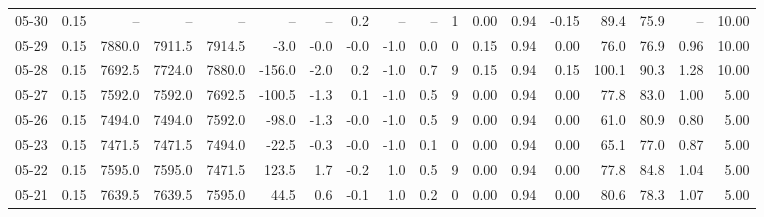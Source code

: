 \begin{threeparttable}
{\begin{tabular}{lrrrrrrrrrrrrrrrrr}
  05-30 &     0.15 &     -- &     -- &     -- &         -- &             -- &                       0.2 &                       -- &                  -- &              1 &       0.00 &      0.94 &          -0.15 &             89.4 &                75.9 &              -- &                  10.00 \\
  05-29 &     0.15 & 7880.0 & 7911.5 & 7914.5 &       -3.0 &           -0.0 &                      -0.0 &                     -1.0 &                 0.0 &              0 &       0.15 &      0.94 &           0.00 &             76.0 &                76.9 &            0.96 &                  10.00 \\
  05-28 &     0.15 & 7692.5 & 7724.0 & 7880.0 &     -156.0 &           -2.0 &                       0.2 &                     -1.0 &                 0.7 &              9 &       0.15 &      0.94 &           0.15 &            100.1 &                90.3 &            1.28 &                  10.00 \\
  05-27 &     0.15 & 7592.0 & 7592.0 & 7692.5 &     -100.5 &           -1.3 &                       0.1 &                     -1.0 &                 0.5 &              9 &       0.00 &      0.94 &           0.00 &             77.8 &                83.0 &            1.00 &                   5.00 \\
  05-26 &     0.15 & 7494.0 & 7494.0 & 7592.0 &      -98.0 &           -1.3 &                      -0.0 &                     -1.0 &                 0.5 &              9 &       0.00 &      0.94 &           0.00 &             61.0 &                80.9 &            0.80 &                   5.00 \\
  05-23 &     0.15 & 7471.5 & 7471.5 & 7494.0 &      -22.5 &           -0.3 &                      -0.0 &                     -1.0 &                 0.1 &              0 &       0.00 &      0.94 &           0.00 &             65.1 &                77.0 &            0.87 &                   5.00 \\
  05-22 &     0.15 & 7595.0 & 7595.0 & 7471.5 &      123.5 &            1.7 &                      -0.2 &                      1.0 &                 0.5 &              9 &       0.00 &      0.94 &           0.00 &             77.8 &                84.8 &            1.04 &                   5.00 \\
  05-21 &     0.15 & 7639.5 & 7639.5 & 7595.0 &       44.5 &            0.6 &                      -0.1 &                      1.0 &                 0.2 &              0 &       0.00 &      0.94 &           0.00 &             80.6 &                78.3 &            1.07 &                   5.00 \\

\end{tabular}}
\end{threeparttable}
